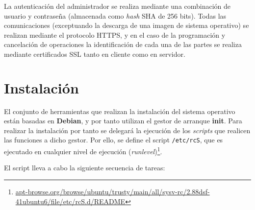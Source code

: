\documentclass{article}
\begin{document}
La autenticación del administrador se realiza mediante una combinación de usuario y contraseña (almacenada como \textit{hash} SHA de 256 bits). Todas las comunicaciones (exceptuando la descarga de una imagen de sistema operativo) se realizan mediante el protocolo HTTPS, y en el caso de la programación y cancelación de operaciones la identificación de cada una de las partes se realiza mediante certificados SSL tanto en cliente como en servidor.

\section{Instalación}

El conjunto de herramientas que realizan la instalación del sistema operativo están basadas en \textbf{Debian}, y por tanto utilizan el gestor de arranque \textbf{init}. Para realizar la instalación por tanto se delegará la ejecución de los \textit{scripts} que realicen las funciones a dicho gestor. Por ello, se define el script \texttt{/etc/rcS}, que es ejecutado en cualquier nivel de ejecución (\textit{runlevel})\footnote{\href{http://apt-browse.org/browse/ubuntu/trusty/main/all/sysv-rc/2.88dsf-41ubuntu6/file/etc/rcS.d/README}{apt-browse.org/browse/ubuntu/trusty/main/all/sysv-rc/2.88dsf-41ubuntu6/file/etc/rcS.d/README}}. 

El script lleva a cabo la siguiente secuencia de tareas:
\end{document}
